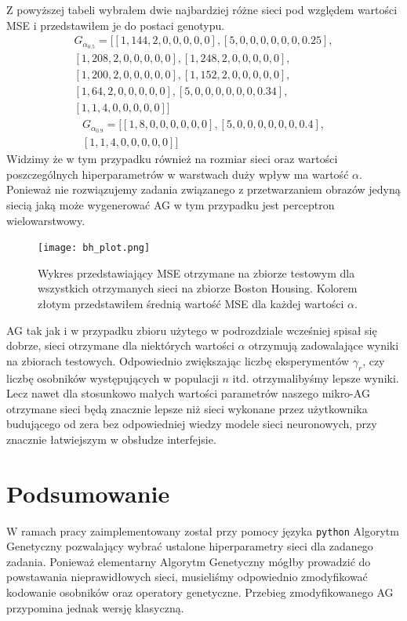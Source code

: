 \documentclass{article}
\begin{document}
Z powyższej tabeli wybrałem dwie najbardziej różne sieci pod względem wartości MSE i 
przedstawiłem je do postaci genotypu.\\
\begin{align*}
	G_{\alpha_{0.5}} = \big[[1, 144, 2, 0, 0, 0, 0, 0], [5, 0, 0, 0, 0, 0, 0, 0.25],\\
	                        [1, 208, 2, 0, 0, 0, 0, 0], [1, 248, 2, 0, 0, 0, 0, 0],\\
				[1, 200, 2, 0, 0, 0, 0, 0], [1, 152, 2, 0, 0, 0, 0, 0],\\
				[1, 64, 2, 0, 0, 0, 0, 0], [5, 0, 0, 0, 0, 0, 0, 0.34],\\
				[1, 1, 4, 0, 0, 0, 0, 0]\big]
\end{align*}
\begin{align*}
	G_{\alpha_{0.9}} = \big[[1, 8, 0, 0, 0, 0, 0, 0], [5, 0, 0, 0, 0, 0, 0, 0.4],\\
	                       [1, 1, 4, 0, 0, 0, 0, 0]\big]
\end{align*}
Widzimy że w tym przypadku również na rozmiar sieci oraz wartości
poszczególnych hiperparametrów w warstwach duży wpływ ma wartość $\alpha$.
Ponieważ nie rozwiązujemy zadania związanego z przetwarzaniem obrazów jedyną siecią 
jaką może wygenerować AG w tym przypadku jest perceptron wielowarstwowy.

\begin{figure}[H]
\centering
\texttt{[image: bh\_plot.png]}
\caption{Wykres przedstawiający MSE otrzymane na zbiorze testowym  dla
wszystkich otrzymanych sieci na zbiorze Boston Housing. Kolorem złotym przedstawiłem
średnią wartość MSE dla każdej wartości $\alpha$.}
\end{figure}

AG tak jak i w przypadku zbioru użytego w podrozdziale wcześniej spisał się dobrze,
sieci otrzymane dla niektórych wartości $\alpha$ otrzymują zadowalające wyniki na zbiorach
testowych. Odpowiednio zwiększając liczbę eksperymentów $\gamma_r$, czy liczbę 
osobników występujących w populacji $n$ itd. otrzymalibyśmy lepsze wyniki.
Lecz nawet dla stosunkowo małych wartości parametrów naszego mikro-AG otrzymane
sieci będą znacznie lepsze niż sieci wykonane przez użytkownika budującego od zera bez odpowiedniej wiedzy modele sieci neuronowych, przy znacznie łatwiejszym w obsłudze interfejsie.\\

\section{Podsumowanie}
W ramach pracy zaimplementowany został przy pomocy języka \texttt{python} Algorytm Genetyczny pozwalający wybrać ustalone hiperparametry sieci dla zadanego zadania. 
Ponieważ elementarny Algorytm Genetyczny mógłby prowadzić do powstawania nieprawidłowych
sieci, musieliśmy odpowiednio zmodyfikować kodowanie osobników oraz operatory genetyczne. 
Przebieg zmodyfikowanego AG przypomina jednak wersję klasyczną.
\end{document}
